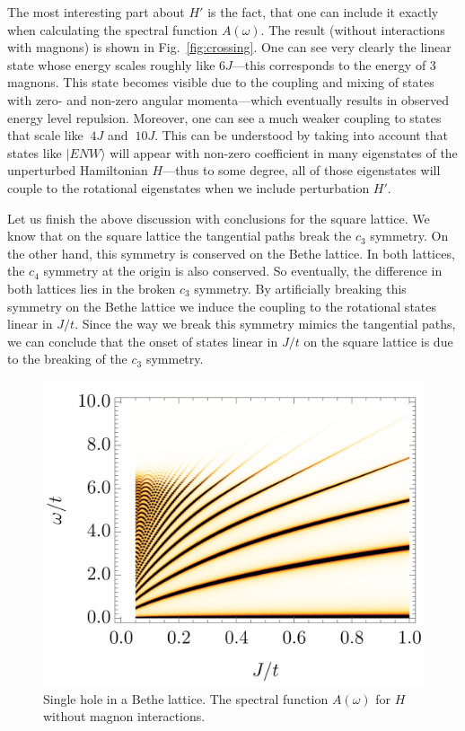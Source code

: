 \documentclass[11pt, a4paper, onecolumn]{article}
\newcommand{\ket}[1]{\vert #1 \rangle}
\begin{document}
The most interesting part about $H'$ is the fact, that one can include it exactly when calculating the spectral function $A(\omega)$. The result (without interactions with magnons) is shown in Fig.~\ref{fig:crossing}. One can see very clearly the linear state whose energy scales roughly like $6J$---this corresponds to the energy of 3 magnons. This state becomes visible due to the coupling and mixing of states with zero- and non-zero angular momenta---which eventually results in observed energy level repulsion. Moreover, one can see a much weaker coupling to states that scale like $~4J$ and $~10J$. This can be understood by taking into account that states like $\ket{ENW}$ will appear with non-zero coefficient in many eigenstates of the unperturbed Hamiltonian $H$---thus to some degree, all of those eigenstates will couple to the rotational eigenstates when we include perturbation $H'$.

Let us finish the above discussion with conclusions for the square lattice. We know that on the square lattice the tangential paths break the $c_3$ symmetry. On the other hand, this symmetry is conserved on the Bethe lattice. In both lattices, the $c_4$ symmetry at the origin is also conserved. So eventually, the difference in both lattices lies in the broken $c_3$ symmetry. By artificially breaking this symmetry on the Bethe lattice we induce the coupling to the rotational states linear in $J/t$. Since the way we break this symmetry mimics the tangential paths, we can conclude that the onset of states linear in $J/t$ on the square lattice is due to the breaking of the $c_3$ symmetry.

\clearpage

\begin{figure}[h!]
	\includegraphics[width=0.79\columnwidth]
	{./figures/bethe.png}
	\caption{
		Single hole in a Bethe lattice. The spectral function $A(\omega)$ for $H$ without magnon interactions.
	}\label{fig:no_crossing}
\end{figure}
\end{document}

